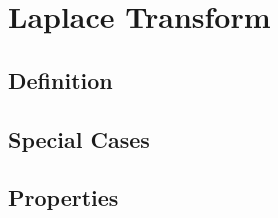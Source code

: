 \section*{Laplace Transform}
\subsection*{Definition}
\subsection*{Special Cases}
\subsection*{Properties}